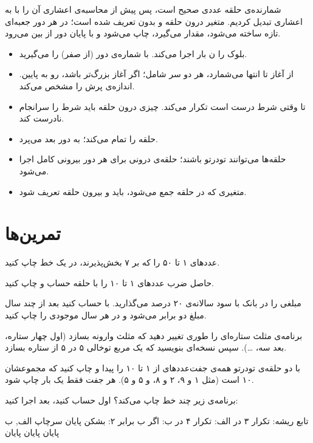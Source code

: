 شمارنده‌ی حلقه عددی صحیح است، پس پیش از محاسبه‌ی اعشاری آن را با
 به اعشاری تبدیل کردیم. متغیر  درون حلقه و بدون
 تعریف شده است؛ در هر دور جعبه‌ای تازه ساخته می‌شود، مقدار
می‌گیرد، چاپ می‌شود و با پایان دور از بین می‌رود.

\begin{summary}
\begin{itemize}
  \item {} بلوک را ن بار اجرا می‌کند. با 
        شماره‌ی دور (از صفر) را می‌گیرید.
  \item {} از آغاز تا انتها می‌شمارد،
        هر دو سر شامل؛ اگر آغاز بزرگ‌تر باشد، رو به پایین. 
        اندازه‌ی پرش را مشخص می‌کند.
  \item {} تا وقتی شرط درست است تکرار می‌کند. چیزی درون
        حلقه باید شرط را سرانجام نادرست کند.
  \item {} حلقه را تمام می‌کند؛  به دور بعد می‌پرد.
  \item حلقه‌ها می‌توانند تودرتو باشند؛ حلقه‌ی درونی برای هر دور بیرونی
        کامل اجرا می‌شود.
  \item متغیری که در حلقه جمع می‌شود، باید  و بیرون حلقه تعریف
        شود.
\end{itemize}
\end{summary}

\section*{تمرین‌ها}

\exercise عددهای ۱ تا ۵۰ را که بر ۷ بخش‌پذیرند، در یک خط چاپ کنید.

\exercise حاصل ضرب عددهای ۱ تا ۱۰ را با حلقه حساب و چاپ کنید.

\exercise مبلغی را در بانک با سود سالانه‌ی ۲۰ درصد می‌گذارید. با
 حساب کنید بعد از چند سال مبلغ دو برابر می‌شود و در هر سال
موجودی را چاپ کنید.

\exercise برنامه‌ی مثلث ستاره‌ای را طوری تغییر دهید که مثلث وارونه بسازد
(اول چهار ستاره، بعد سه، \ldots). سپس نسخه‌ای بنویسید که یک مربع توخالی
۵ در ۵ از ستاره بسازد.

\exercise با دو حلقه‌ی تودرتو همه‌ی جفت‌عددهای از ۱ تا ۱۰ را پیدا و چاپ
کنید که مجموعشان ۱۰ است (مثل ۱ و ۹، ۲ و ۸، و ۵ و ۵). هر جفت فقط یک بار چاپ شود.

\exercise برنامه‌ی زیر چند خط چاپ می‌کند؟ اول حساب کنید، بعد اجرا کنید:
\begin{salamfa}
تابع ریشه:
    تکرار ۳ در الف:
        تکرار ۴ در ب:
            اگر ب برابر ۲: بشکن پایان
            سرچاپ الف, ب
        پایان
    پایان
پایان
\end{salamfa}
